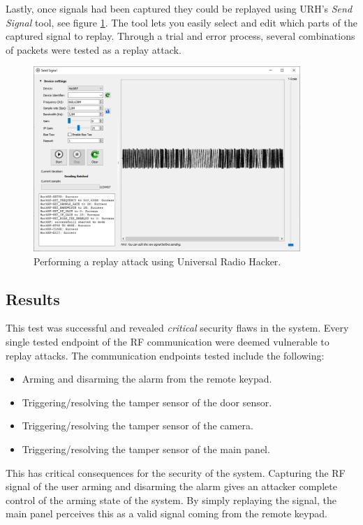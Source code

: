 Lastly, once signals had been captured they could be replayed using URH's \textit{Send Signal} tool, see figure \ref{fig:uhr-replay-tool}. The tool lets you easily select and edit which parts of the captured signal to replay. Through a trial and error process, several combinations of packets were tested as a replay attack.
\begin{figure}[!ht]
    \centering
    \includegraphics[width=0.9\textwidth]{images/6-pentesting/replay-signal.png}
    \caption{Performing a replay attack using Universal Radio Hacker.}
    \label{fig:uhr-replay-tool}
\end{figure}

\subsection{Results}
This test was successful and revealed \textit{critical} security flaws in the system. Every single tested endpoint of the RF communication were deemed vulnerable to replay attacks. The communication endpoints tested include the following:
\begin{itemize}
    \item Arming and disarming the alarm from the remote keypad.
    \item Triggering/resolving the tamper sensor of the door sensor.
    \item Triggering/resolving the tamper sensor of the camera.
    \item Triggering/resolving the tamper sensor of the main panel.
\end{itemize}
This has critical consequences for the security of the system. Capturing the RF signal of the user arming and disarming the alarm gives an attacker complete control of the arming state of the system. By simply replaying the signal, the main panel perceives this as a valid signal coming from the remote keypad.


